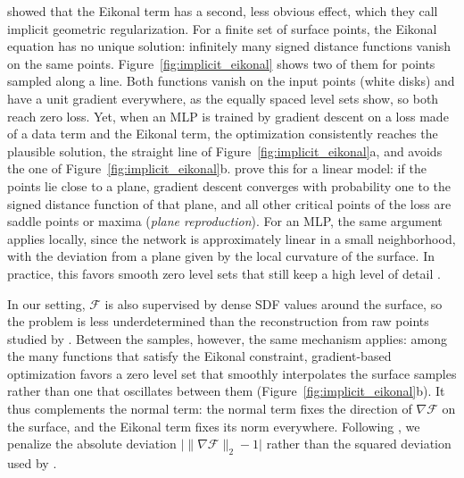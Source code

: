 \citet{gropp2020} showed that the Eikonal term has a second, less obvious effect, which
they call implicit geometric regularization. For a finite set of surface points, the
Eikonal equation has no unique solution: infinitely many signed distance functions vanish on
the same points. Figure~\ref{fig:implicit_eikonal} shows two of them for points sampled
along a line. Both functions vanish on the input points (white disks) and have a unit
gradient everywhere, as the equally spaced level sets show, so both reach zero loss. Yet,
when an MLP is trained by gradient descent on a loss made of a data term and the Eikonal
term, the optimization consistently reaches the plausible solution, the straight line of
Figure~\ref{fig:implicit_eikonal}a, and avoids the one of
Figure~\ref{fig:implicit_eikonal}b. \citet{gropp2020} prove this for a linear model: if the
points lie close to a plane, gradient descent converges with probability one to the signed
distance function of that plane, and all other critical points of the loss are saddle
points or maxima (\emph{plane reproduction}). For an MLP, the same argument applies
locally, since the network is approximately linear in a small neighborhood, with the
deviation from a plane given by the local curvature of the surface. In practice, this
favors smooth zero level sets that still keep a high level of detail \cite{gropp2020}.

In our setting, $\mathcal{F}$ is also supervised by dense SDF values around the surface,
so the problem is less underdetermined than the reconstruction from raw points studied by
\citet{gropp2020}. Between the samples, however, the same mechanism applies: among the many functions that satisfy the Eikonal constraint, gradient-based optimization favors a zero level set that smoothly interpolates the surface samples rather than one that oscillates between them (Figure~\ref{fig:implicit_eikonal}b). It thus complements the normal term: the normal term
fixes the direction of $\nabla\mathcal{F}$ on the surface, and the Eikonal term fixes its
norm everywhere. Following \citet{zhang2024}, we penalize the absolute deviation
$\big|\|\nabla\mathcal{F}\|_2 - 1\big|$ rather than the squared deviation used by
\citet{gropp2020}.

